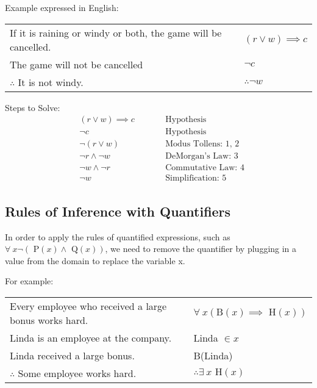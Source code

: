 Example expressed in English:
\begin{center}
  \begin{tabular}{lrl}
    If it is raining or windy or both, the game will be cancelled. &  & $(r \lor w) \implies c$ \\
    The game will not be cancelled                                 &  & $\lnot c$               \\
    \hhline{-~-}
    $\therefore$ It is not windy.                                  &  & $\therefore \lnot w$
  \end{tabular}

  Steps to Solve:
  \begin{align}
     & (r \lor w) \implies c &  & \qquad \text{Hypothesis}          \\
     & \lnot c               &  & \qquad \text{Hypothesis}          \\
     & \lnot (r \lor w)      &  & \qquad \text{Modus Tollens: 1, 2} \\
     & \lnot r \land \lnot w &  & \qquad \text{DeMorgan's Law: 3}   \\
     & \lnot w \land \lnot r &  & \qquad \text{Commutative Law: 4}  \\
     & \lnot w               &  & \qquad \text{Simplification: 5}
  \end{align}
\end{center}

\subsection{Rules of Inference with Quantifiers}

In order to apply the rules of quantified expressions, such as $\forall~ x \lnot (\text{ P}(x) \land \text{ Q}(x))$,
we need to remove the quantifier by plugging in a value from the domain to replace the variable x.

For example:
\begin{center}
  \begin{tabular}{lrl}
    Every employee who received a large bonus works hard. &  & $\forall~ x (\text{B}(x) \implies \text{ H}(x))$ \\
    Linda is an employee at the company.                  &  & Linda $\in x$                                   \\
    Linda received a large bonus.                         &  & B(Linda)                                        \\
    \hhline{-~-}
    $\therefore$ Some employee works hard.                &  & $\therefore \exists~ x \text{ H}(x)$
  \end{tabular}
\end{center}

